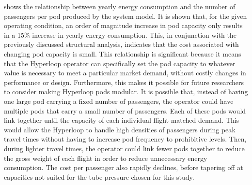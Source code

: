  shows the relationship between yearly
energy consumption and the number of passengers per pod produced by the system model.
It is shown that, for the given operating condition, an order of magnitude
increase in pod capacity only results in a 15\% increase in yearly energy consumption.
This, in conjunction with the previously discussed structural analysis,
indicates that the cost associated with changing pod capacity is small.
This relationship is significant because it means that the Hyperloop operator
can specifically set the pod capacity to whatever value is necessary to meet a
particular market demand, without costly changes in performance or design.
Furthermore, this makes it possible for future researchers to consider making
Hyperloop pods modular. It is possible that, instead of having one large pod
carrying a fixed number of passengers, the operator could have multiple pods
that carry a small number of passengers. Each of these pods would link together until the capacity
of each individual flight matched demand.
This would allow the Hyperloop to handle high densities of passengers during
peak travel times without having to increase pod frequency to prohibitive levels.
Then, during lighter travel times, the operator could link fewer pods together
to reduce the gross weight of each flight in order to reduce unnecessary energy consumption.
The cost per passenger also rapidly declines, before tapering off at capacities
not suited for the tube pressure chosen for this study.
